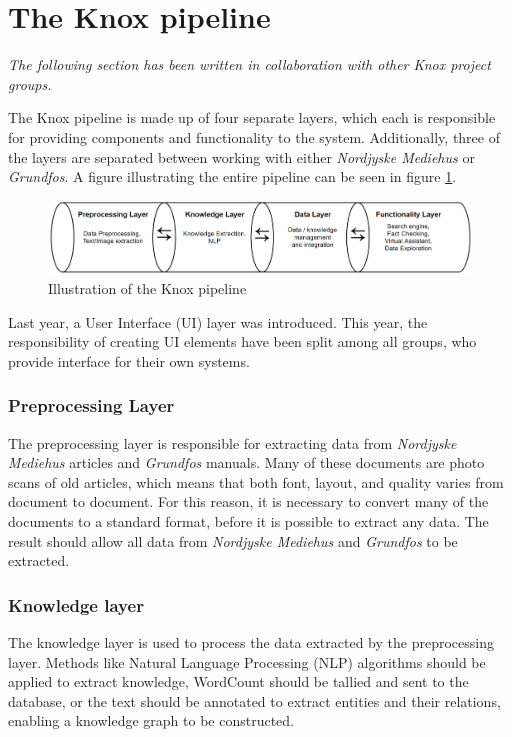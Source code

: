 \section{The Knox pipeline}\label{the_knox_pipeline}
\textit{The following section has been written in collaboration with other Knox project groups.}


The Knox pipeline is made up of four separate layers, which each is responsible for providing components and functionality to the system.
 Additionally, three of the layers are separated between working with either \textit{Nordjyske Mediehus} or \textit{Grundfos}.
  A figure illustrating the entire pipeline can be seen in figure \ref{fig:pipeline}.

\begin{figure}[h]
    \centering
    \includegraphics[width=1\textwidth]{Images/Pipeline.PNG}
    \caption{Illustration of the Knox pipeline\label{fig:pipeline}}
\end{figure}

Last year, a User Interface (UI) layer was introduced. This year, the responsibility of creating UI elements have been split among all groups, who provide interface for their own systems.

\subsubsection{Preprocessing Layer}
The preprocessing layer is responsible for extracting data from \textit{Nordjyske Mediehus} articles and \textit{Grundfos} manuals. Many of these documents are photo scans of old articles, which means that both font, layout, and quality varies from document to document. For this reason, it is necessary to convert many of the documents to a standard format, before it is possible to extract any data. The result should allow all data from \textit{Nordjyske Mediehus} and \textit{Grundfos} to be extracted. 

\subsubsection{Knowledge layer}
The knowledge layer is used to process the data extracted by the preprocessing layer. Methods like Natural Language Processing (NLP) algorithms should be applied to extract knowledge, WordCount should be tallied and sent to the database, or the text should be annotated to extract entities and their relations, enabling a knowledge graph to be constructed.

